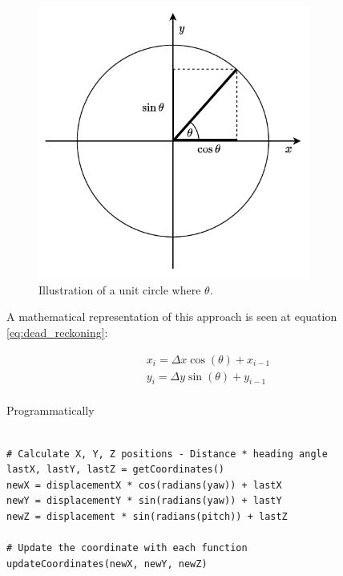 \begin{figure}[!h]
  \centering
  \includegraphics[width=0.8\textwidth]{figures/trignometric.pdf}
  \caption{Illustration of a unit circle where $\theta$.}
  \label{fig:trignometric}
\end{figure}

A mathematical representation of this approach is seen at equation \ref{eq:dead_reckoning}:

\begin{equation}
  \begin{gathered}
    x_i = \Delta x \cos (\theta) + x_{i-1} \\
    y_i = \Delta y \sin (\theta) + y_{i-1} \\
  \end{gathered}
  \label{eq:dead_reckoning}
\end{equation}

Programmatically

\lstset{language=Python}
\begin{lstlisting}[frame=single]  % Start your code-block
    
# Calculate X, Y, Z positions - Distance * heading angle
lastX, lastY, lastZ = getCoordinates()
newX = displacementX * cos(radians(yaw)) + lastX
newY = displacementY * sin(radians(yaw)) + lastY
newZ = displacement * sin(radians(pitch)) + lastZ 

# Update the coordinate with each function
updateCoordinates(newX, newY, newZ)
    
\end{lstlisting}

